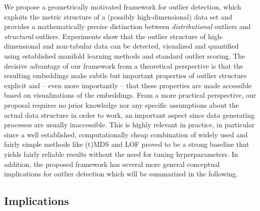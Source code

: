 \documentclass[
  10pt]{article}
\begin{document}
We propose a geometrically motivated framework for outlier detection, which exploits the metric structure of a (possibly high-dimensional) data set and provides a mathematically precise distinction between \emph{distributional} outliers and \emph{structural} outliers. Experiments show that the outlier structure of high-dimensional and non-tabular data can be detected, visualized and quantified using established manifold learning methods and standard outlier scoring. The decisive advantage of our framework from a theoretical perspective is that the resulting embeddings make subtle but important properties of outlier structure explicit and -- even more importantly -- that these properties are made accessible based on visualizations of the embeddings. From a more practical perspective, our proposal requires no prior knowledge nor any specific assumptions about the actual data structure in order to work, an important aspect since data generating processes are usually inaccessible. This is highly relevant in practice, in particular since a well established, computationally cheap combination of widely used and fairly simple methods like (t)MDS and LOF proved to be a strong baseline that yields fairly reliable results without the need for tuning hyperparameters. In addition, the proposed framework has several more general conceptual implications for outlier detection which will be summarized in the following.

\hypertarget{sec:disc:implications}{%
\subsection{Implications}\label{sec:disc:implications}}
\end{document}
